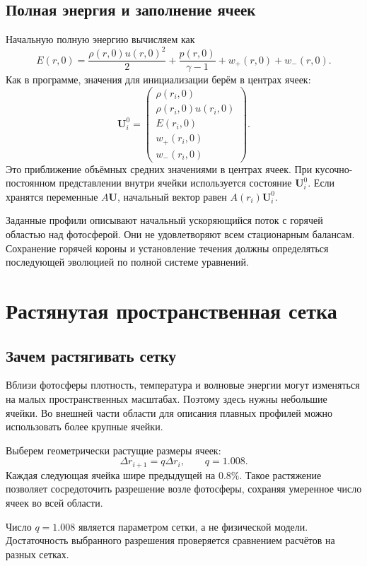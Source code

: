 \documentclass[11pt,a4paper]{article}
\begin{document}
\subsection{Полная энергия и заполнение ячеек}

Начальную полную энергию вычисляем как
\[
E(r,0)
=
\frac{\rho(r,0)u(r,0)^2}{2}
+\frac{p(r,0)}{\gamma-1}
+w_+(r,0)+w_-(r,0).
\]
Как в программе, значения для инициализации
берём в центрах ячеек:
\[
\bm U_i^0=
\begin{pmatrix}
\rho(r_i,0)\\
\rho(r_i,0)u(r_i,0)\\
E(r_i,0)\\
w_+(r_i,0)\\
w_-(r_i,0)
\end{pmatrix}.
\]
Это приближение объёмных средних
значениями в центрах ячеек.
При кусочно-постоянном представлении
внутри ячейки используется состояние $\bm U_i^0$.
Если хранятся переменные $A\bm U$,
начальный вектор равен $A(r_i)\bm U_i^0$.

Заданные профили описывают начальный ускоряющийся поток
с горячей областью над фотосферой.
Они не удовлетворяют всем стационарным балансам.
Сохранение горячей короны и установление течения
должны определяться последующей эволюцией
по полной системе уравнений.


\section{Растянутая пространственная сетка}
\label{sec:stretched_grid}

\subsection{Зачем растягивать сетку}

Вблизи фотосферы плотность, температура и волновые
энергии могут изменяться на малых пространственных
масштабах. Поэтому здесь нужны небольшие ячейки.
Во внешней части области для описания плавных профилей
можно использовать более крупные ячейки.

Выберем геометрически растущие размеры ячеек:
\[
\Delta r_{i+1}=q\Delta r_i,\qquad q=1.008.
\]
Каждая следующая ячейка шире предыдущей на $0.8\%$.
Такое растяжение позволяет сосредоточить разрешение
возле фотосферы, сохраняя умеренное число ячеек
во всей области.

Число $q=1.008$ является параметром сетки,
а не физической модели.
Достаточность выбранного разрешения
проверяется сравнением расчётов на разных сетках.
\end{document}
